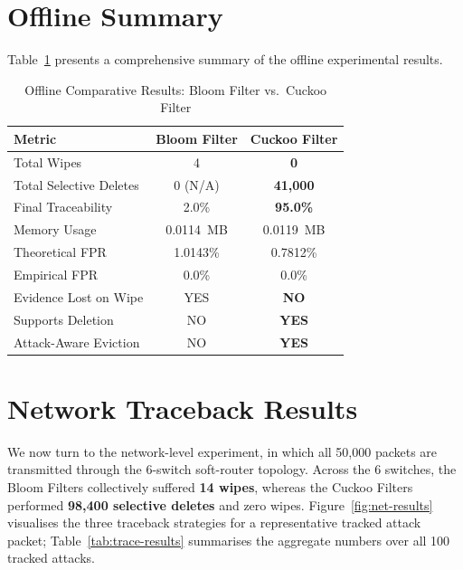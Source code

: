 \documentclass[12pt, a4paper]{report}
\begin{document}
\section{Offline Summary}

Table~\ref{tab:results} presents a comprehensive summary of the offline
experimental results.

\begin{table}[H]
\centering
\caption{Offline Comparative Results: Bloom Filter vs.\ Cuckoo Filter}
\label{tab:results}
\begin{tabular}{lcc}
\toprule
\textbf{Metric} & \textbf{Bloom Filter} & \textbf{Cuckoo Filter} \\
\midrule
Total Wipes              & 4           & \textbf{0}       \\
Total Selective Deletes  & 0 (N/A)     & \textbf{41{,}000}  \\
Final Traceability       & 2.0\%       & \textbf{95.0\%}  \\
Memory Usage             & 0.0114~MB   & 0.0119~MB        \\
Theoretical FPR          & 1.0143\%    & 0.7812\%         \\
Empirical FPR            & 0.0\%       & 0.0\%            \\
Evidence Lost on Wipe    & YES         & \textbf{NO}      \\
Supports Deletion        & NO          & \textbf{YES}     \\
Attack-Aware Eviction    & NO          & \textbf{YES}     \\
\bottomrule
\end{tabular}
\end{table}

\section{Network Traceback Results}

We now turn to the network-level experiment, in which all 50{,}000
packets are transmitted through the 6-switch soft-router topology.
Across the 6 switches, the Bloom Filters collectively suffered
\textbf{14 wipes}, whereas the Cuckoo Filters performed
\textbf{98{,}400 selective deletes} and zero wipes.
Figure~\ref{fig:net-results} visualises the three traceback strategies
for a representative tracked attack packet; Table~\ref{tab:trace-results}
summarises the aggregate numbers over all 100 tracked attacks.
\end{document}
